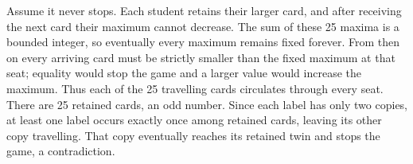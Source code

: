Assume it never stops. Each student retains their larger card, and after receiving the next card their maximum cannot decrease. The sum of these 25 maxima is a bounded integer, so eventually every maximum remains fixed forever. From then on every arriving card must be strictly smaller than the fixed maximum at that seat; equality would stop the game and a larger value would increase the maximum. Thus each of the 25 travelling cards circulates through every seat. There are 25 retained cards, an odd number. Since each label has only two copies, at least one label occurs exactly once among retained cards, leaving its other copy travelling. That copy eventually reaches its retained twin and stops the game, a contradiction.
